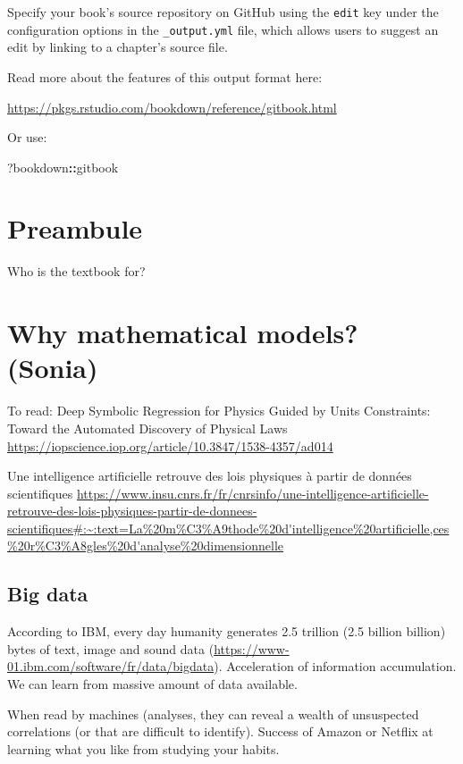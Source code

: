 \documentclass[
]{book}
\newenvironment{Shaded}{\begin{snugshade}}{\end{snugshade}}
\newcommand{\NormalTok}[1]{#1}
\newcommand{\SpecialCharTok}[1]{\textcolor[rgb]{0.81,0.36,0.00}{\textbf{#1}}}
\theoremstyle{definition}
\theoremstyle{definition}
\theoremstyle{definition}
\theoremstyle{definition}
\theoremstyle{remark}
\begin{document}
Specify your book's source repository on GitHub using the \texttt{edit} key under the configuration options in the \texttt{\_output.yml} file, which allows users to suggest an edit by linking to a chapter's source file.

Read more about the features of this output format here:

\url{https://pkgs.rstudio.com/bookdown/reference/gitbook.html}

Or use:

\begin{Shaded}
\begin{Highlighting}[]
\NormalTok{?bookdown}\SpecialCharTok{::}\NormalTok{gitbook}
\end{Highlighting}
\end{Shaded}

\chapter{Preambule}\label{preambule}

Who is the textbook for?

\chapter{Why mathematical models? (Sonia)}\label{why-mathematical-models-sonia}

To read:
Deep Symbolic Regression for Physics Guided by Units Constraints: Toward the Automated Discovery of Physical Laws
\url{https://iopscience.iop.org/article/10.3847/1538-4357/ad014}

Une intelligence artificielle retrouve des lois physiques à partir de données scientifiques
\url{https://www.insu.cnrs.fr/fr/cnrsinfo/une-intelligence-artificielle-retrouve-des-lois-physiques-partir-de-donnees-scientifiques\#:~:text=La\%20m\%C3\%A9thode\%20d'intelligence\%20artificielle,ces\%20r\%C3\%A8gles\%20d'analyse\%20dimensionnelle}

\section{Big data}\label{big-data}

According to IBM, every day humanity generates 2.5 trillion (2.5 billion billion) bytes of text, image and sound data (\url{https://www-01.ibm.com/software/fr/data/bigdata}). Acceleration of information accumulation. We can learn from massive amount of data available.

When read by machines (analyses, they can reveal a wealth of unsuspected correlations (or that are difficult to identify). Success of Amazon or Netflix at learning what you like from studying your habits.
\end{document}
